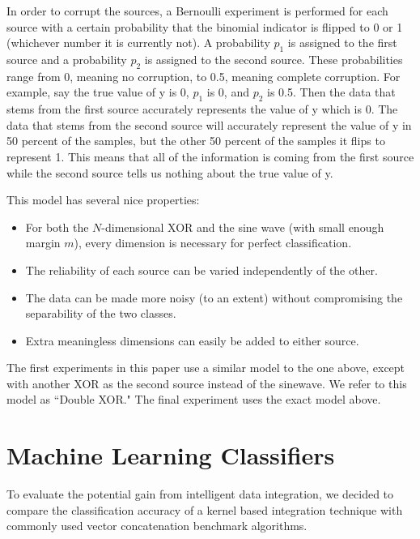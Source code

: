 \documentclass{article}
\begin{document}
In order to corrupt the sources, a Bernoulli experiment is performed for each source with a certain probability that the binomial indicator is flipped to 0 or 1 (whichever number it is currently not). A probability $p_1$ is assigned to the first source and a probability $p_2$ is assigned to the second source.  These probabilities range from 0, meaning no corruption, to 0.5, meaning complete corruption. For example, say the true value of y is 0, $p_1$ is 0, and $p_2$ is 0.5. Then the data that stems from the first source accurately represents the value of y which is 0. The data that stems from the second source will accurately represent the value of y in 50 percent of the samples, but the other 50 percent of the samples it flips to represent 1. This means that all of the information is coming from the first source while the second source tells us nothing about the true value of y.

This model has several nice properties:
\begin{itemize}
    \item For both the $N$-dimensional XOR and the sine wave (with small enough
        margin $m$), every dimension is necessary for perfect classification.
    \item The reliability of each source can be varied independently of the
        other.
    \item The data can be made more noisy (to an extent) without
        compromising the separability of the two classes.
    \item Extra meaningless dimensions can easily be added to either source.
\end{itemize}

The first experiments in this paper use a similar model to the one above, except with another XOR as the second source instead of the sinewave. We refer to this model as ``Double XOR." The final experiment uses the exact model above.











\section*{Machine Learning Classifiers}

To evaluate the potential gain from intelligent data integration, we decided to compare the classification accuracy of a kernel based integration technique with commonly used vector concatenation benchmark algorithms.
\end{document}
